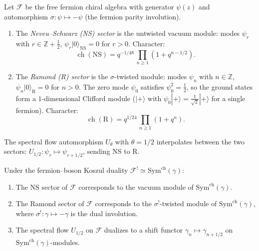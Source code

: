 \begin{definition}\label{def:ramond-ns}
Let $\mathcal{F}$ be the free fermion chiral algebra with generator
$\psi(z)$ and automorphism $\sigma: \psi \mapsto -\psi$ (the fermion
parity involution).
\begin{enumerate}[label=\textup{(\roman*)}]
\item The \emph{Neveu--Schwarz (NS) sector} is the untwisted vacuum
  module: modes $\psi_{r}$ with $r \in \mathbb{Z} + \tfrac{1}{2}$,
  $\psi_r|0\rangle_{\mathrm{NS}} = 0$ for $r > 0$.  Character:
  \[
  \operatorname{ch}(\mathrm{NS})
  = q^{-1/48}\,\prod_{n \geq 1}(1 + q^{n-1/2}).
  \]
\item The \emph{Ramond (R) sector} is the $\sigma$-twisted module:
  modes $\psi_n$ with $n \in \mathbb{Z}$, $\psi_n|0\rangle_{\mathrm{R}} = 0$
  for $n > 0$.  The zero mode $\psi_0$ satisfies $\psi_0^2 = \tfrac{1}{2}$,
  so the ground states form a $1$-dimensional Clifford module
  ($|+\rangle$ with $\psi_0|+\rangle = \tfrac{1}{\sqrt{2}}|+\rangle$
  for a single fermion).
  Character:
  \[
  \operatorname{ch}(\mathrm{R})
  = q^{1/24}\,\prod_{n \geq 1}(1 + q^n).
  \]
\end{enumerate}
The spectral flow automorphism $U_\theta$ with $\theta = 1/2$
interpolates between the two sectors:
$U_{1/2}: \psi_r \mapsto \psi_{r+1/2}$, sending NS to R.
\end{definition}

\begin{proposition}
\label{prop:twisted-fermion-kd}
Under the fermion--boson Koszul duality
$\mathcal{F}^! \simeq \mathrm{Sym}^{\mathrm{ch}}(\gamma)$:
\begin{enumerate}[label=\textup{(\roman*)}]
\item The NS sector of $\mathcal{F}$ corresponds to the vacuum module
  of $\mathrm{Sym}^{\mathrm{ch}}(\gamma)$.
\item The Ramond sector of $\mathcal{F}$ corresponds to the
  $\sigma^!$-twisted module of $\mathrm{Sym}^{\mathrm{ch}}(\gamma)$,
  where $\sigma^!: \gamma \mapsto -\gamma$ is the dual involution.
\item The spectral flow $U_{1/2}$ on $\mathcal{F}$ dualizes to a
  shift functor $\gamma_n \mapsto \gamma_{n+1/2}$ on
  $\mathrm{Sym}^{\mathrm{ch}}(\gamma)$-modules.
\end{enumerate}
\end{proposition}

